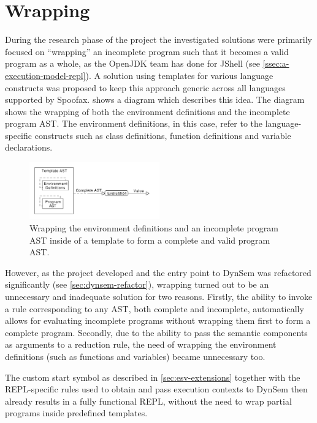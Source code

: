 \section{Wrapping}
\label{sec:wrapping}

During the research phase of the project the investigated solutions were
primarily focused on ``wrapping'' an incomplete program such that it becomes a
valid program as a whole, as the OpenJDK team has done for JShell (see
\cref{ssec:a-execution-model-repl}). A solution using templates for various
language constructs was proposed to keep this approach generic across all
languages supported by Spoofax.  shows a diagram which
describes this idea. The diagram shows the wrapping of both the environment
definitions and the incomplete program AST. The environment definitions, in
this case, refer to the language-specific constructs such as class definitions,
function definitions and variable declarations.

\begin{figure}[b]
  \centering
  \includegraphics[width=0.5\textwidth]{wrapping}
  \caption{Wrapping the environment definitions and an incomplete program AST
    inside of a template to form a complete and valid program AST.}
  \label{fig:wrapping}
\end{figure}

However, as the project developed and the entry point to DynSem was refactored
significantly (see \cref{sec:dynsem-refactor}), wrapping turned out to be an
unnecessary and inadequate solution for two reasons. Firstly, the ability to
invoke a rule corresponding to any AST, both complete and incomplete,
automatically allows for evaluating incomplete programs without wrapping them
first to form a complete program. Secondly, due to the ability to pass the
semantic components as arguments to a reduction rule, the need of wrapping the
environment definitions (such as functions and variables) became unnecessary
too.

The custom start symbol as described in \cref{sec:esv-extensions} together with
the REPL-specific rules used to obtain and pass execution contexts to DynSem
then already results in a fully functional REPL, without the need to wrap
partial programs inside predefined templates.

